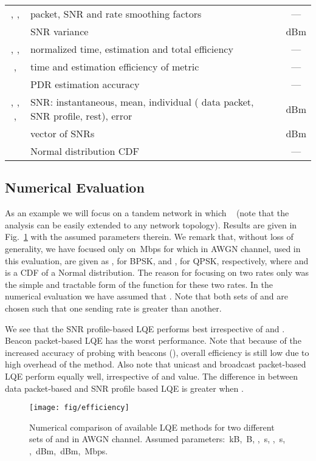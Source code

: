 \documentclass[11pt,draftclsnofoot,journal,onecolumn]{IEEEtran}
\begin{document}
\begin{table*}
\begin{tabular}{c|l|c}
  , ,  & packet, SNR and rate smoothing factors & --- \\
   & SNR variance & dBm \\
  , ,  & normalized time, estimation and total efficiency & --- \\
  ,  & time and estimation efficiency of metric  & --- \\
   & PDR estimation accuracy & --- \\
  , , ,  & SNR: instantaneous, mean, individual ( data packet,  SNR profile,  rest), error & dBm \\
   & vector of SNRs & dBm\\
   & Normal distribution CDF & --- \\
  \hline
\end{tabular}
\end{table*}

\subsection{Numerical Evaluation}

As an example we will focus on a tandem network in which ~\cite[Ch. 3]{Hekmat_phd_thesis} (note that the analysis can be easily extended to any network topology). Results are given in Fig.~\ref{fig:method_comp} with the assumed parameters therein. We remark that, without loss of generality, we have focused only on \,Mbps for which  in AWGN channel, used in this evaluation, are given as , for BPSK, and , for QPSK, respectively, where  and  is a CDF of a Normal distribution. The reason for focusing on two rates only was the simple and tractable form of the  function for these two rates. In the numerical evaluation we have assumed that . Note that both sets of  and  are chosen such that one sending rate is greater than another.

We see that the SNR profile-based LQE performs best irrespective of  and . Beacon packet-based LQE has the worst performance. Note that because of the increased accuracy of probing with beacons (), overall efficiency is still low due to high overhead of the method. Also note that unicast and broadcast packet-based LQE perform equally well, irrespective of  and  value. The difference in  between data packet-based and SNR profile based LQE is greater when .

\begin{figure}
\centering
\texttt{[image: fig/efficiency]}
\caption{Numerical comparison of available LQE methods for two different sets of  and  in AWGN channel. Assumed parameters: \,kB, \,B, , \,s, , \,s, , \,dBm, \,dBm, \,Mbps.}
\label{fig:method_comp}
\end{figure}
\end{document}
